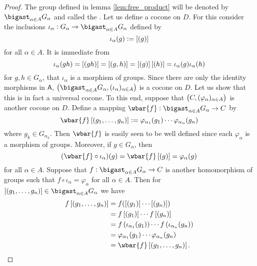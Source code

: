 \begin{proof}
	The group defined in lemma \ref{lem:free_product} will be denoted by $\bigast_{\alpha \in A}G_\alpha$ and called the . Let us define a cocone on $D$. For this consider the inclusions $\iota_\alpha : G_\alpha \to \bigast_{\alpha \in A}G_\alpha$ defined by
	\begin{equation*}
		\iota_\alpha(g) := \sbr[0]{(g)}
	\end{equation*}
	\noindent for all $\alpha \in A$. It is immediate from
	\begin{equation*}
		\iota_\alpha(gh) = \sbr[0]{(gh)} = \sbr[0]{(g,h)} = \sbr[0]{(g)}\sbr[0]{(h)} = \iota_\alpha(g)\iota_\alpha(h)
	\end{equation*}
	\noindent for $g,h \in G_\alpha$, that $\iota_\alpha$ is a morphism of groups. Since there are only the identity morphisms in $\mathsf{A}$, $\del[1]{\bigast_{\alpha \in A}G_\alpha, (\iota_\alpha)_{\alpha \in A}}$ is a cocone on $D$. Let us show that this is in fact a universal cocone. To this end, suppose that $\del[1]{C,(\varphi_\alpha)_{\alpha \in A}}$ is another cocone on $D$. Define a mapping $\wbar{f} : \bigast_{\alpha \in A}G_\alpha \to C$ by
	\begin{equation*}
		\wbar{f}\sbr[0]{(g_1,\dots,g_n)} := \varphi_{\alpha_1}(g_1)\cdots \varphi_{\alpha_n}(g_n)
	\end{equation*}
	\noindent where $g_k \in G_{\alpha_k}$. Then $\wbar{f}$ is easily seen to be well defined since each $\varphi_\alpha$ is  a morphism of groups. Moreover, if $g \in G_\alpha$, then
	\begin{equation*}
		(\wbar{f} \circ \iota_\alpha)(g) = \wbar{f}\sbr[0]{(g)} = \varphi_\alpha(g)
	\end{equation*}
	\noindent for all $\alpha \in A$. Suppose that $f : \bigast_{\alpha \in A}G_\alpha \to C$ is another homomorphism of groups such that $f \circ \iota_\alpha = \varphi_\alpha$ for all $\alpha \in A$. Then for $\sbr[0]{(g_1,\dots,g_n)} \in \bigast_{\alpha \in A} G_\alpha$ we have
	\begin{align*}
		f\sbr[0]{(g_1,\dots,g_n)} &= f(\sbr[0]{(g_1)} \cdots \sbr[0]{(g_n)})\\
		&= f\sbr[0]{(g_1)} \cdots f\sbr[0]{(g_n)}\\
		&= f\del[0]{\iota_{\alpha_1}(g_1)} \cdots f\del[0]{\iota_{\alpha_n}(g_n)}\\
		&= \varphi_{\alpha_1}(g_1)\cdots \varphi_{\alpha_n}(g_n)\\
		&= \wbar{f}\sbr[0]{(g_1,\dots,g_n)}.
	\end{align*}
\end{proof}

